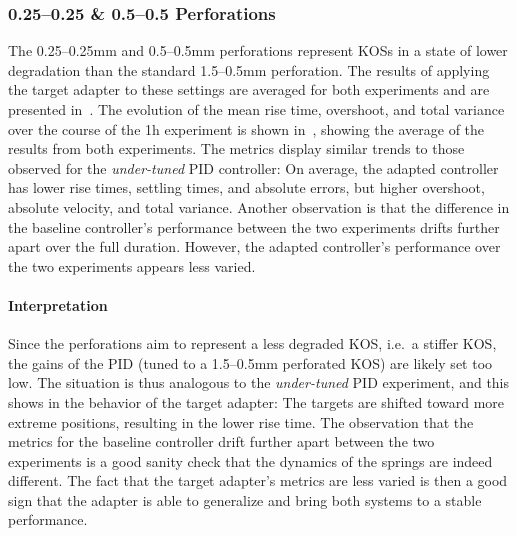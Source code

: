 \subsubsection{0.25--0.25 \& 0.5--0.5 Perforations}
The 0.25--0.25\si{\mm} and 0.5--0.5\si{\mm} perforations represent KOSs in a state of lower degradation than the standard 1.5--0.5\si{\mm} perforation.
The results of applying the target adapter to these settings are averaged for both experiments and are presented in~.
The evolution of the mean rise time, overshoot, and total variance over the course of the 1\si{\hour} experiment is shown in~, showing the average of the results from both experiments.
The metrics display similar trends to those observed for the \emph{under-tuned} PID controller:
On average, the adapted controller has lower rise times, settling times, and absolute errors, but higher overshoot, absolute velocity, and total variance.
Another observation is that the difference in the baseline controller's performance between the two experiments drifts further apart over the full duration.
However, the adapted controller's performance over the two experiments appears less varied.


\paragraph*{Interpretation}
Since the perforations aim to represent a less degraded KOS, i.e.~a stiffer KOS, the gains of the PID (tuned to a 1.5--0.5\si{\mm} perforated KOS) are likely set too low.
The situation is thus analogous to the \emph{under-tuned} PID experiment, and this shows in the behavior of the target adapter:
The targets are shifted toward more extreme positions, resulting in the lower rise time.
The observation that the metrics for the baseline controller drift further apart between the two experiments is a good sanity check that the dynamics of the springs are indeed different.
The fact that the target adapter's metrics are less varied is then a good sign that the adapter is able to generalize and bring both systems to a stable performance.

